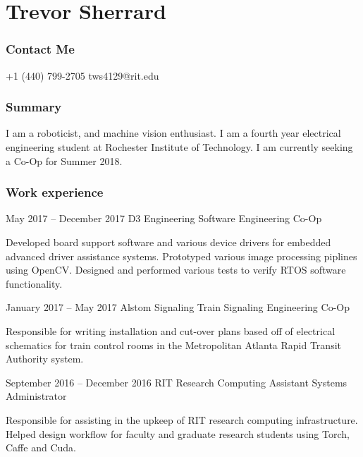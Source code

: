 \documentclass{tccv}
\begin{document}
\part{Trevor Sherrard}
\section{Contact Me}
\begin{eventlist}
    {+1 (440) 799-2705}
    {tws4129@rit.edu}
    
\end{eventlist}

\section{Summary}
I am a roboticist, and machine vision enthusiast. I am a fourth year electrical engineering student at Rochester Institute of Technology. I am currently seeking a Co-Op for Summer 2018. 

\section{Work experience}

\begin{eventlist}

\item{May 2017 -- December 2017}
     {D3 Engineering}
     {Software Engineering Co-Op}
     
Developed board support software and various device drivers for embedded advanced driver assistance systems. Prototyped various image processing piplines using OpenCV. Designed and performed various tests to verify RTOS software functionality.

\item{January 2017 -- May 2017}
     {Alstom Signaling}
     {Train Signaling Engineering Co-Op}

Responsible for writing installation and cut-over plans based off of electrical schematics for train control rooms in the Metropolitan Atlanta Rapid Transit Authority system.

\item{September 2016 -- December 2016}
	 {RIT Research Computing}
	 {Assistant Systems Administrator}
	 
Responsible for assisting in the upkeep of RIT research computing infrastructure. Helped design workflow for faculty and graduate research students using Torch, Caffe and Cuda. 

\end{eventlist}
\end{document}
